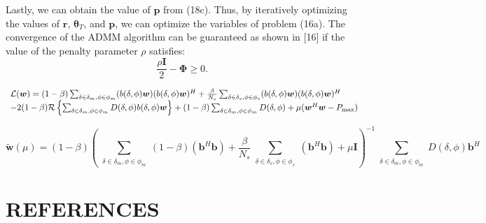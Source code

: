 \documentclass[journal,comsoc]{IEEEtran}
\begin{document}
	
	Lastly, we can obtain the value of $\boldsymbol{p}$ from (18c). Thus, by iteratively optimizing the values of $\boldsymbol{r}$, $\boldsymbol{\theta}_T$, and $\boldsymbol{p}$, we can optimize the variables of problem (16a). The convergence of the ADMM algorithm can be guaranteed as shown in [16] if the value of the penalty parameter $\rho$ satisfies:
	\begin{equation}
		\frac{\rho\mathbf{I}}{2} - \mathbf{\Phi} \geq 0.
	\end{equation}
	
	
\begin{strip}
	\begin{equation}
		\begin{array}{l@{}l}
		\mathcal{L}(\boldsymbol{w}) = (1 - \beta) \sum_{\substack{\delta \in \delta_m, \phi \in \phi_m}} (b(\delta, \phi)\boldsymbol{w})(b(\delta, \phi)\boldsymbol{w})^H + \frac{\beta}{N_s} \sum_{\substack{\delta \in \delta_s, \phi \in \phi_s}} (b(\delta, \phi)\boldsymbol{w})(b(\delta, \phi)\boldsymbol{w})^H 
		\\- 2(1 - \beta)\mathcal{R}\left\{ \sum_{\substack{\delta \in \delta_m, \phi \in \phi_m}} D(\delta, \phi)b(\delta, \phi)\boldsymbol{w} \right\} + (1 - \beta) \sum_{\substack{\delta \in \delta_m, \phi \in \phi_m}} D(\delta, \phi) + \mu(\boldsymbol{w}^H \boldsymbol{w} - P_{\text{max}})
		\label{eq:9}
	\end{array}
	\end{equation}
	
	\begin{equation}
		\tilde{\boldsymbol{w}}(\mu) = (1 - \beta) \left( \sum_{\substack{\delta \in \delta_m, \phi \in \phi_m}} (1 - \beta)(\boldsymbol{b}^H \boldsymbol{b}) + \frac{\beta}{N_s} \sum_{\substack{\delta \in \delta_s, \phi \in \phi_s}} (\boldsymbol{b}^H \boldsymbol{b}) + \mu\mathbf{I} \right)^{-1} \sum_{\substack{\delta \in \delta_m, \phi \in \phi_m}} D(\delta, \phi)\boldsymbol{b}^H
		\label{eq:10}
	\end{equation}
\end{strip}
	\section{REFERENCES}
	
\end{document}
